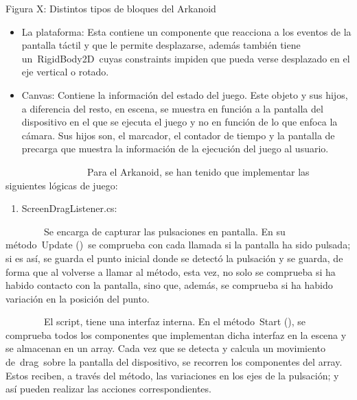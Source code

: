 \documentclass[]{article}
\begin{document}
Figura X: Distintos tipos de bloques del Arkanoid

\begin{itemize}
\itemsep1pt\parskip0pt
\item
  La plataforma: Esta contiene un componente que reacciona a los eventos
  de la pantalla táctil y que le permite desplazarse, además también
  tiene un~RigidBody2D~cuyas constraints impiden que pueda verse
  desplazado en el eje vertical o rotado.
\item
  Canvas: Contiene la información del estado del juego. Este objeto y
  sus hijos, a diferencia del resto, en escena, se muestra en función a
  la pantalla del dispositivo en el que se ejecuta el juego y no en
  función de lo que enfoca la cámara. Sus hijos son, el marcador, el
  contador de tiempo y la pantalla de precarga que muestra la
  información de la ejecución del juego al usuario.
\end{itemize}


~~~~~~~~~~~~~~~~~Para el Arkanoid, se han tenido que implementar las
siguientes lógicas de juego:

\begin{enumerate}
\itemsep1pt\parskip0pt
\item
  ScreenDragListener.cs:
\end{enumerate}

~~~~~~~~Se encarga de capturar las pulsaciones en pantalla. En su
método~Update ()~se comprueba con cada llamada si la pantalla ha sido
pulsada; si es así, se guarda el punto inicial donde se detectó la
pulsación y se guarda, de forma que al volverse a llamar al método, esta
vez, no solo se comprueba si ha habido contacto con la pantalla, sino
que, además, se comprueba si ha habido variación en la posición del
punto.

~~~~~~~~El script, tiene una interfaz interna. En el método~Start (), se
comprueba todos los componentes que implementan dicha interfaz en la
escena y se almacenan en un array. Cada vez que se detecta y calcula un
movimiento de~drag~sobre la pantalla del dispositivo, se recorren los
componentes del array. Estos reciben, a través del método, las
variaciones en los ejes de la pulsación; y así pueden realizar las
acciones correspondientes.
\end{document}
